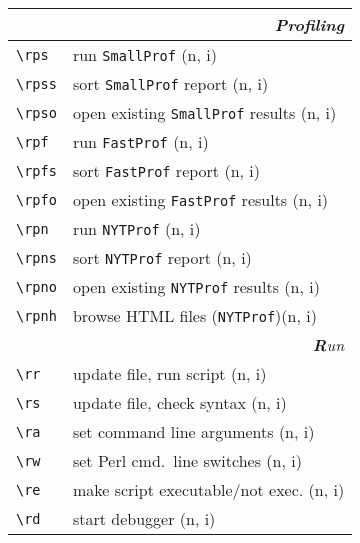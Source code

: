 \documentclass[oneside,10pt,landscape,DIV17]{scrartcl}
\begin{document}
\begin{multicols}{2}
%
\begin{tabular}[]{|p{11mm}|p{61mm}|}
\hline
\multicolumn{2}{|r|}{\textsl{\textbf{P}rofiling}}                 \\[1.0ex]
\hline \verb'\rps'     & run \verb'SmallProf'                    \hfill (n, i)\\
\hline \verb'\rpss'    & sort \verb'SmallProf' report            \hfill (n, i)\\
\hline \verb'\rpso'    & open existing \verb'SmallProf' results  \hfill (n, i)\\
\hline
%
\hline \verb'\rpf'     & run \verb'FastProf'                    \hfill (n, i)\\
\hline \verb'\rpfs'    & sort \verb'FastProf' report            \hfill (n, i)\\
\hline \verb'\rpfo'    & open existing \verb'FastProf' results  \hfill (n, i)\\
%
\hline
\hline \verb'\rpn'     & run \verb'NYTProf'                    \hfill (n, i)\\
\hline \verb'\rpns'    & sort \verb'NYTProf' report            \hfill (n, i)\\
\hline \verb'\rpno'    & open existing \verb'NYTProf' results  \hfill (n, i)\\
\hline \verb'\rpnh'    & browse HTML files (\verb'NYTProf')\hfill (n, i)\\
\hline
\hline
\multicolumn{2}{|r|}{\textsl{\textbf{R}un}} \\[1.0ex]
\hline \verb'\rr'    & update file, run script                  \hfill (n, i)   \\
\hline \verb'\rs'    & update file, check syntax                \hfill (n, i)   \\
\hline \verb'\ra'    & set command line arguments               \hfill (n, i)   \\
\hline \verb'\rw'    & set Perl cmd.\ line switches             \hfill (n, i)   \\
\hline \verb'\re'    & make script executable/not exec.         \hfill (n, i)   \\
\hline \verb'\rd'    & start debugger                           \hfill (n, i)   \\

\end{tabular}
\end{multicols}
\end{document}
